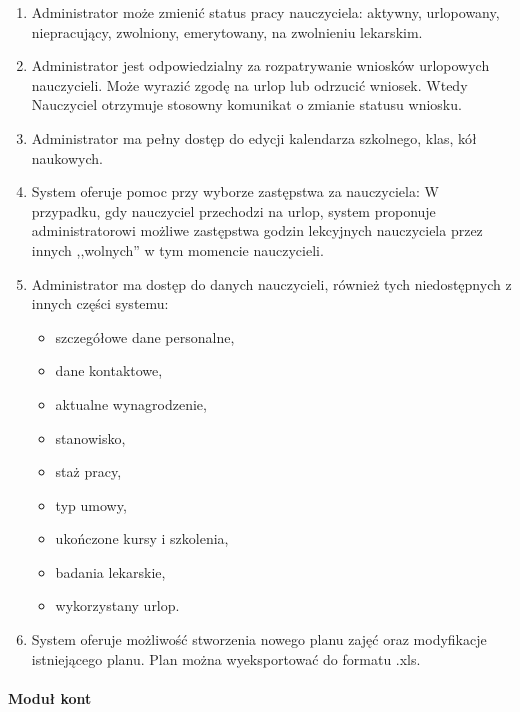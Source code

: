 \documentclass{article}
\begin{document}
\begin{enumerate}
\item Administrator może zmienić status pracy nauczyciela: aktywny, urlopowany, niepracujący, zwolniony, emerytowany, na zwolnieniu lekarskim.
\item Administrator jest odpowiedzialny za rozpatrywanie wniosków urlopowych nauczycieli. Może wyrazić zgodę na urlop lub odrzucić wniosek. Wtedy Nauczyciel otrzymuje stosowny komunikat o zmianie statusu wniosku.
\item Administrator ma pełny dostęp do edycji kalendarza szkolnego, klas, kół naukowych.
\item System oferuje pomoc przy wyborze zastępstwa za nauczyciela:
W przypadku, gdy nauczyciel przechodzi na urlop, system proponuje administratorowi możliwe zastępstwa godzin lekcyjnych nauczyciela przez innych ,,wolnych'' w tym momencie nauczycieli.
\item Administrator ma dostęp do danych nauczycieli, również tych niedostępnych z innych części systemu:
\begin{itemize}
\item szczegółowe dane personalne,
\item dane kontaktowe,
\item aktualne wynagrodzenie,
\item stanowisko,
\item staż pracy,
\item typ umowy,
\item ukończone kursy i szkolenia,
\item badania lekarskie,
\item wykorzystany urlop.
\end{itemize}
\item System oferuje możliwość stworzenia nowego planu zajęć oraz modyfikacje istniejącego planu. Plan można wyeksportować do formatu .xls.
 
\end{enumerate}

\paragraph{Moduł kont} \mbox{}\\
\end{document}
